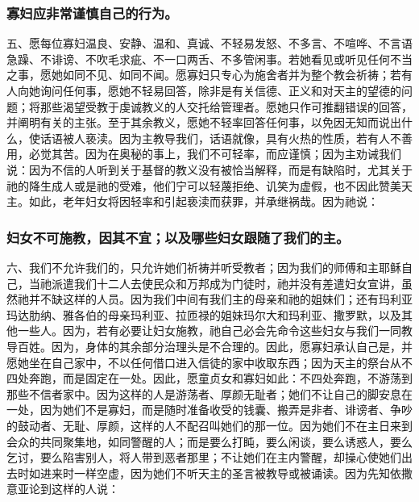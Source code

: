 
\subsubsection{寡妇应非常谨慎自己的行为。}

五、愿每位寡妇温良、安静、温和、真诚、不轻易发怒、不多言、不喧哗、不言语急躁、不诽谤、不吹毛求疵、不一口两舌、不多管闲事。若她看见或听见任何不当之事，愿她如同不见、如同不闻。愿寡妇只专心为施舍者并为整个教会祈祷；若有人向她询问任何事，愿她不轻易回答，除非是有关信德、正义和对天主的望德的问题；将那些渴望受教于虔诚教义的人交托给管理者。愿她只作可推翻错误的回答，并阐明有关的主张。至于其余教义，愿她不轻率回答任何事，以免因无知而说出什么，使话语被人亵渎。因为主教导我们，话语就像，具有火热的性质，若有人不善用，必觉其苦。因为在奥秘的事上，我们不可轻率，而应谨慎；因为主劝诫我们说：因为不信的人听到关于基督的教义没有被恰当解释，而是有缺陷时，尤其关于祂的降生成人或是祂的受难，他们宁可以轻蔑拒绝、讥笑为虚假，也不因此赞美天主。如此，老年妇女将因轻率和引起亵渎而获罪，并承继祸哉。因为祂说：\par


\subsubsection{妇女不可施教，因其不宜；以及哪些妇女跟随了我们的主。}

六、我们不允许我们的，只允许她们祈祷并听受教者；因为我们的师傅和主耶稣自己，当祂派遣我们十二人去使民众和万邦成为门徒时，祂并没有差遣妇女宣讲，虽然祂并不缺这样的人员。因为我们中间有我们主的母亲和祂的姐妹们；还有玛利亚玛达肋纳、雅各伯的母亲玛利亚、拉匝禄的姐妹玛尔大和玛利亚、撒罗默，以及其他一些人。因为，若有必要让妇女施教，祂自己必会先命令这些妇女与我们一同教导百姓。因为，身体的其余部分治理头是不合理的。因此，愿寡妇承认自己是，并愿她坐在自己家中，不以任何借口进入信徒的家中收取东西；因为天主的祭台从不四处奔跑，而是固定在一处。因此，愿童贞女和寡妇如此：不四处奔跑，不游荡到那些不信者家中。因为这样的人是游荡者、厚颜无耻者；她们不让自己的脚安息在一处，因为她们不是寡妇，而是随时准备收受的钱囊、搬弄是非者、诽谤者、争吵的鼓动者、无耻、厚颜，这样的人不配召叫她们的那一位。因为她们不在主日来到会众的共同聚集地，如同警醒的人；而是要么打盹，要么闲谈，要么诱惑人，要么乞讨，要么陷害别人，将人带到恶者那里；不让她们在主内警醒，却操心使她们出去时如进来时一样空虚，因为她们不听天主的圣言被教导或被诵读。因为先知依撒意亚论到这样的人说：\par

